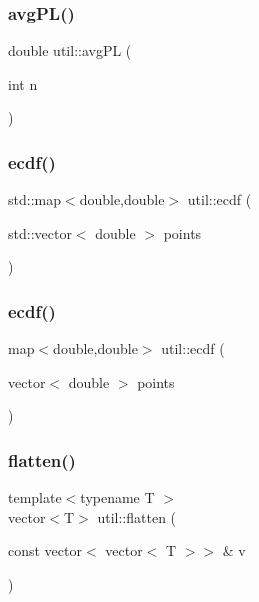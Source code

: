 \mbox{\label{namespaceutil_a1f106b9a1a65806393f73a3c8dbf01a6}} 
\subsubsection{\texorpdfstring{avg\+P\+L()}{avgPL()}}
{\footnotesize\ttfamily double util\+::avg\+PL (\begin{DoxyParamCaption}\item[{int}]{n }\end{DoxyParamCaption})}

\mbox{\label{namespaceutil_abfb0e38d71ca69f5f6a505b3f5f7dc52}} 
\subsubsection{\texorpdfstring{ecdf()}{ecdf()}\hspace{0.1cm}{\footnotesize\ttfamily [1/2]}}
{\footnotesize\ttfamily std\+::map$<$double,double$>$ util\+::ecdf (\begin{DoxyParamCaption}\item[{std\+::vector$<$ double $>$}]{points }\end{DoxyParamCaption})}

\mbox{\label{namespaceutil_ac7478c2543d3bf4901961c719ecc7d04}} 
\subsubsection{\texorpdfstring{ecdf()}{ecdf()}\hspace{0.1cm}{\footnotesize\ttfamily [2/2]}}
{\footnotesize\ttfamily map$<$double,double$>$ util\+::ecdf (\begin{DoxyParamCaption}\item[{vector$<$ double $>$}]{points }\end{DoxyParamCaption})}

\mbox{\label{namespaceutil_a3da5afd362118ed04ca18ec46d5e6a96}} 
\subsubsection{\texorpdfstring{flatten()}{flatten()}}
{\footnotesize\ttfamily template$<$typename T $>$ \\
vector$<$T$>$ util\+::flatten (\begin{DoxyParamCaption}\item[{const vector$<$ vector$<$ T $>$$>$ \&}]{v }\end{DoxyParamCaption})}

